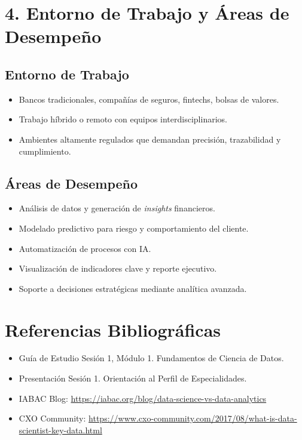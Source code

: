 \documentclass[12pt]{article}
\begin{document}
\section*{4. Entorno de Trabajo y Áreas de Desempeño}

\subsection*{Entorno de Trabajo}
\begin{itemize}
    \item Bancos tradicionales, compañías de seguros, fintechs, bolsas de valores.
    \item Trabajo híbrido o remoto con equipos interdisciplinarios.
    \item Ambientes altamente regulados que demandan precisión, trazabilidad y cumplimiento.
\end{itemize}

\subsection*{Áreas de Desempeño}
\begin{itemize}
    \item Análisis de datos y generación de \textit{insights} financieros.
    \item Modelado predictivo para riesgo y comportamiento del cliente.
    \item Automatización de procesos con IA.
    \item Visualización de indicadores clave y reporte ejecutivo.
    \item Soporte a decisiones estratégicas mediante analítica avanzada.
\end{itemize}

\section*{Referencias Bibliográficas}
\begin{itemize}
    \item Guía de Estudio Sesión 1, Módulo 1. Fundamentos de Ciencia de Datos.
    \item Presentación Sesión 1. Orientación al Perfil de Especialidades.
    \item IABAC Blog: \url{https://iabac.org/blog/data-science-vs-data-analytics}
    \item CXO Community: \url{https://www.cxo-community.com/2017/08/what-is-data-scientist-key-data.html}
\end{itemize}
\end{document}
